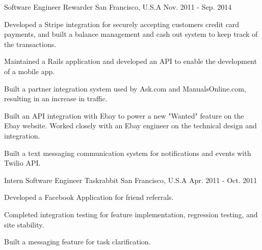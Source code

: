 \begin{cventries}
  \cventry
    {Software Engineer}
    {Rewarder}
    {San Francisco, U.S.A}
    {Nov. 2011 - Sep. 2014}
    {
      \begin{cvitems}
        \item {Developed a Stripe integration for securely accepting customers credit card payments, and built a balance management and cash out system to keep track of the transactions.}
        \item {Maintained a Rails application and developed an API to enable the development of a mobile app.}
        \item {Built a partner integration system used by Ask.com and ManualsOnline.com, resulting in an increase in traffic.}
        \item {Built an API integration with Ebay to power a new "Wanted" feature on the Ebay website. Worked closely with an Ebay engineer on the technical design and integration.}
        \item{Built a text messaging communication system for notifications and events with Twilio API.}
      \end{cvitems}
    }
    
  \cventry
    {Intern Software Engineer}
    {Taskrabbit}
    {San Francisco, U.S.A}
    {Apr. 2011 - Oct. 2011}
    {
      \begin{cvitems}
        \item {Developed a Facebook Application for friend referrals.}
        \item{Completed integration testing for feature implementation, regression testing, and site stability.}
        \item{Built a messaging feature for task clarification.}
      \end{cvitems}
    }
\end{cventries}
